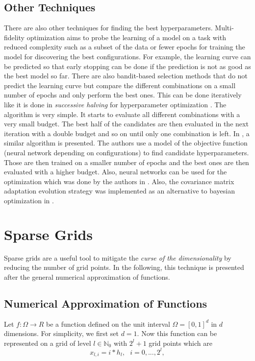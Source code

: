 \subsection{Other Techniques}
There are also other techniques for finding the best hyperparameters. Multi-fidelity optimization \cite{feurer2019hyperparameter} aims to probe the learning of a model on a task with reduced complexity such as a subset of the data or fewer epochs for training the model for discovering the best configurations. For example, the learning curve can be predicted so that early stopping can be done if the prediction is not as good as the best model so far. There are also bandit-based selection methods that do not predict the learning curve but compare the different combinations on a small number of epochs and only perform the best ones. This can be done iteratively like it is done in \textit{successive halving} for hyperparameter optimization \cite{jamieson2016non}. The algorithm is very simple. It starts to evaluate all different combinations with a very small budget. The best half of the candidates are then evaluated in the next iteration with a double budget and so on until only one combination is left. In \cite{8030298}, a similar algorithm is presented. The authors use a model of the objective function (neural network depending on configurations) to find candidate hyperparameters. Those are then trained on a smaller number of epochs and the best ones are then evaluated with a higher budget. Also, neural networks can be used for the optimization which was done by the authors in \cite{smithson2016neural}. Also, the covariance matrix adaptation evolution strategy was implemented as an alternative to bayesian optimization in \cite{loshchilov2016cma}. 


\section{Sparse Grids}

Sparse grids are a useful tool to mitigate the \textit{curse of the dimensionality} by reducing the number of grid points. In the following, this technique is presented after the general numerical approximation of functions.

\subsection{Numerical Approximation of Functions}

Let $ f: \Omega \rightarrow R $ be a function defined on the unit interval $ \Omega = [0,1]^d $ in $ d $ dimensions. For simplicity, we first set $ d=1$. Now this function can be represented on a grid of level $ l \in \mathbb{N}_0 $ with $ 2^l + 1 $ grid points which are 
\begin{equation}
	x_{l,i} = i*h_l, \text{   } i = 0,...,2^l,
\end{equation}

